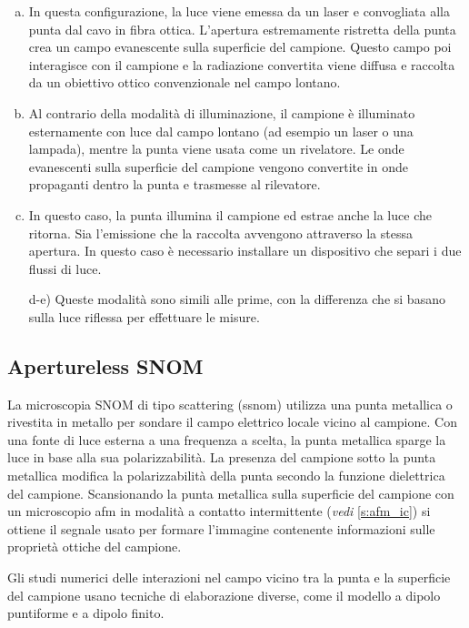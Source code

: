 \documentclass[../main.tex]{subfiles}
\begin{document}
\begin{enumerate}[a)]
	\item In questa configurazione, la luce viene emessa da un laser e convogliata alla punta dal cavo in fibra ottica. L'apertura estremamente ristretta della punta crea un campo evanescente sulla superficie del campione. Questo campo poi interagisce con il campione e la radiazione convertita viene diffusa e raccolta da un obiettivo ottico convenzionale nel campo lontano.
	\item Al contrario della modalità di illuminazione, il campione è illuminato esternamente con luce dal campo lontano (ad esempio un laser o una lampada), mentre la punta viene usata come un rivelatore. Le onde evanescenti sulla superficie del campione vengono convertite in onde propaganti dentro la punta e trasmesse al rilevatore.
	\item In questo caso, la punta illumina il campione ed estrae anche la luce che ritorna. Sia l'emissione che la raccolta avvengono attraverso la stessa apertura. In questo caso è necessario installare un dispositivo che separi i due flussi di luce.
	\item[d-e)] Queste modalità sono simili alle prime, con la differenza che si basano sulla luce riflessa per effettuare le misure.
\end{enumerate}

\subsection{Apertureless SNOM}

La microscopia SNOM di tipo scattering (\acrshort{ssnom}) utilizza una punta metallica o rivestita in metallo per sondare il campo elettrico locale vicino al campione. Con una fonte di luce esterna a una frequenza a scelta, la punta metallica sparge la luce in base alla sua polarizzabilità. La presenza del campione sotto la punta metallica modifica la polarizzabilità della punta secondo la funzione dielettrica del campione. Scansionando la punta metallica sulla superficie del campione con un microscopio \acrshort{afm} in modalità a contatto intermittente (\textit{vedi} \ref{s:afm_ic}) si ottiene il segnale usato per formare l'immagine contenente informazioni sulle proprietà ottiche del campione.\cite{wang_2015}

Gli studi numerici delle interazioni nel campo vicino tra la punta e la superficie del campione usano tecniche di elaborazione diverse, come il modello a dipolo puntiforme e a dipolo finito.\cite{cvitkovic_2007}\\
\end{document}
